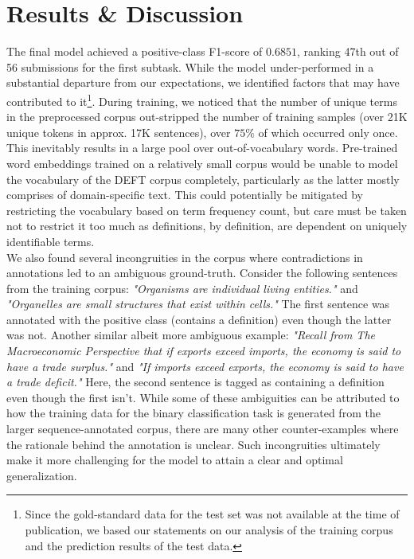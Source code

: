 \documentclass[11pt]{article}
\begin{document}
\section{Results \& Discussion}
The final model achieved a positive-class F1-score of $0.6851$, ranking 47th out of 56 submissions for the first subtask. While the
model under-performed in a substantial departure from our expectations, we identified factors that may have contributed to
it\footnote{Since the gold-standard data for the test set was not available at the time of publication, we based our statements on
our analysis of the training corpus and the prediction results of the test data.}. During training, we noticed that the number of
unique terms in the preprocessed corpus out-stripped the number of training samples (over 21K unique tokens in approx. 17K
sentences), over $75\%$ of which occurred only once. This inevitably results in a large pool over out-of-vocabulary words.
Pre-trained word embeddings trained on a relatively small corpus would be unable to model the vocabulary of the DEFT corpus completely,
particularly as the latter mostly comprises of domain-specific text. This could potentially be mitigated by restricting the
vocabulary based on term frequency count, but care must be taken not to restrict it too much as definitions, by definition, are
dependent on uniquely identifiable terms.\\

We also found several incongruities in the corpus where contradictions in annotations led to an ambiguous ground-truth. Consider the
following sentences from the training corpus: \emph{"Organisms are individual living entities."} and \emph{"Organelles are small
structures that exist within cells."} The first sentence was annotated with the positive class (contains a definition) even though the
latter was not. Another similar albeit more ambiguous example: \emph{"Recall from The Macroeconomic Perspective that if exports exceed imports, the economy is said to have a trade surplus."} and \emph{"If imports exceed exports, the economy is said to have a trade deficit."} Here, the second sentence is tagged as containing a definition even though the first isn't. While some of these
ambiguities can be attributed to how the training data for the binary classification task is generated from the larger sequence-annotated
corpus, there are many other counter-examples where the rationale behind the annotation is unclear. Such incongruities ultimately
make it more challenging for the model to attain a clear and optimal generalization.\\
\end{document}
